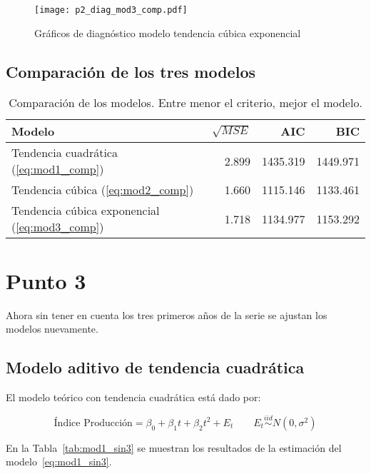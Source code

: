 \documentclass{tufte-handout}
\begin{document}
\begin{figure*}[!ht]
    \texttt{[image: p2\_diag\_mod3\_comp.pdf]}
    \caption{Gráficos de diagnóstico modelo tendencia cúbica exponencial}
    \label{fig:p2_diag_mod3_comp.pdf}
\end{figure*}

\subsection*{Comparación de los tres modelos}

\begin{table}[ht]
\centering
\begin{tabular}{lrrr}
  Modelo     & $\sqrt{MSE}$ & AIC & BIC \\ 
  \hline
Tendencia cuadrática (\ref{eq:mod1_comp}) & 2.899 & 1435.319 & 1449.971 \\ 
Tendencia cúbica (\ref{eq:mod2_comp}) & 1.660 & 1115.146 & 1133.461 \\ 
Tendencia cúbica exponencial (\ref{eq:mod3_comp}) & 1.718 & 1134.977 & 1153.292 \\ 
   \hline
\end{tabular}
\caption{Comparación de los modelos. Entre menor el criterio, mejor el modelo.} 
\label{tab:comparacion_modelos}
\end{table}


\section*{Punto 3}

Ahora sin tener en cuenta los tres primeros años de la serie se ajustan los modelos nuevamente.

\subsection*{Modelo aditivo de tendencia cuadrática}

El modelo teórico con tendencia cuadrática está dado por:

\begin{equation} \label{eq:mod1_sin3}
	\text{Índice Producción} = \beta_0 + \beta_1 t + \beta_2 t^2 + E_t
	\qquad E_t \stackrel{iid}{\sim} N(0, \sigma^2)
\end{equation}

En la Tabla~\ref{tab:mod1_sin3} se muestran los resultados de la estimación del modelo~\ref{eq:mod1_sin3}.
\end{document}
